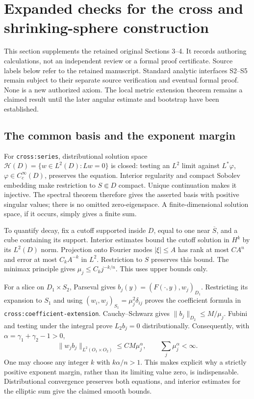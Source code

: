 \documentclass[11pt]{article}
\theoremstyle{definition}
\theoremstyle{remark}
\numberwithin{equation}{section}
\begin{document}
\section{Expanded checks for the cross and shrinking-sphere construction}
\label{cross-expanded:section}

This section supplements the retained original Sections 3--4. It records
authoring calculations, not an independent review or a formal proof certificate.
Source labels below refer
to the retained manuscript. Standard analytic interfaces S2--S5 remain subject
to their separate source verification and eventual formal proof. None is a new
authorized axiom. The local metric extension theorem remains a claimed result
until the later angular estimate and bootstrap have been established.

\subsection{The common basis and the exponent margin}
\label{cross-expanded:series}
For \texttt{cross:series}, distributional solution space
$\mathcal H(D)=\{w\in L^2(D):Lw=0\}$ is closed: testing an $L^2$ limit
against $L^*\varphi$, $\varphi\in C_c^\infty(D)$, preserves the equation.
Interior regularity and compact Sobolev embedding make restriction to
$S\Subset D$ compact. Unique continuation makes it injective. The spectral
theorem therefore gives the asserted basis with positive singular values;
there is no omitted zero-eigenspace. A finite-dimensional solution space,
if it occurs, simply gives a finite sum.

To quantify decay, fix a cutoff supported inside $D$, equal to one near
$\overline S$, and a cube containing its support. Interior estimates bound
the cutoff solution in $H^k$ by its $L^2(D)$ norm. Projection onto Fourier
modes $|\xi|\le A$ has rank at most $C A^n$ and error at most $C_k A^{-k}$
in $L^2$. Restriction to $S$ preserves this bound. The minimax principle
gives $\mu_j\le C_k j^{-k/n}$. This uses upper bounds only.

For a slice on $D_1\times S_2$, Parseval gives
$b_j(y)=(F(\cdot,y),w_j)_{D_1}$. Restricting its expansion to $S_1$
and using $(w_i,w_j)_{S_1}=\mu_j^2\delta_{ij}$ proves the coefficient
formula in \texttt{cross:coefficient-extension}. Cauchy--Schwarz gives
$\|b_j\|_{D_2}\le M/\mu_j$. Fubini and testing under the integral
prove $L_2b_j=0$ distributionally. Consequently, with
$\alpha=\gamma_1+\gamma_2-1>0$,
\[
 \|w_jb_j\|_{L^2(O_1\times O_2)}\le CM\mu_j^\alpha,
 \qquad \sum_j\mu_j^\alpha<\infty.
\]
One may choose any integer $k$ with $k\alpha/n>1$. This makes explicit
why a strictly positive exponent margin, rather than its limiting value zero,
is indispensable. Distributional convergence preserves both equations, and
interior estimates for the elliptic sum give the claimed smooth bounds.
\end{document}
